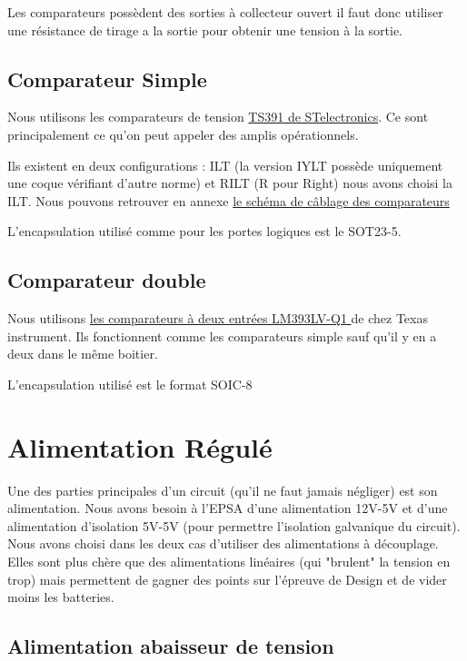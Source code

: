 \documentclass{EPSA-rap-template}
\begin{document}
Les comparateurs possèdent des sorties à collecteur ouvert il faut donc utiliser une résistance de tirage a la sortie pour obtenir une tension à la sortie.

\subsection{Comparateur Simple}

Nous utilisons les comparateurs de tension \hyperlink{Comparateur}{TS391 de STelectronics}. Ce sont principalement ce qu'on peut appeler des amplis opérationnels.

Ils existent en deux configurations : ILT (la version IYLT possède uniquement une coque vérifiant d'autre norme) et RILT (R pour Right) nous avons choisi la ILT. Nous pouvons retrouver en annexe \hyperlink{AmpliOp}{le schéma de câblage des comparateurs }

L'encapsulation utilisé comme pour les portes logiques est le SOT23-5.

\subsection{Comparateur double}

Nous utilisons \hyperlink{ComparateurDouble}{ les comparateurs à deux entrées LM393LV-Q1 } de chez Texas instrument. Ils fonctionnent comme les comparateurs simple sauf qu'il y en a deux dans le même boitier.

L'encapsulation utilisé est le format SOIC-8

\section{Alimentation Régulé}

Une des parties principales d'un circuit (qu'il ne faut jamais négliger) est son alimentation. Nous avons besoin à l'EPSA d'une alimentation 12V-5V et d'une alimentation d'isolation 5V-5V (pour permettre l'isolation galvanique du circuit). Nous avons choisi dans les deux cas d'utiliser des alimentations à découplage. Elles sont plus chère que des alimentations linéaires (qui "brulent" la tension en trop) mais permettent de gagner des points sur l'épreuve de Design et de vider moins les batteries.

\subsection{Alimentation abaisseur de tension}
\end{document}
